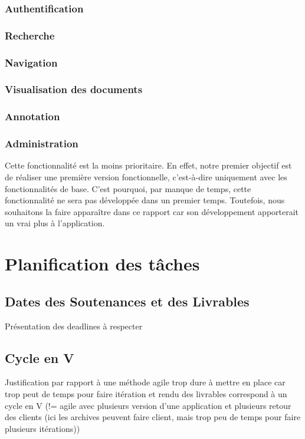 \documentclass[a4paper]{article}
\begin{document}
\subsubsection{Authentification}
\subsubsection{Recherche}
\subsubsection{Navigation}
\subsubsection{Visualisation des documents}
\subsubsection{Annotation}


\subsubsection{Administration}

	Cette fonctionnalité est la moins prioritaire. En effet, notre premier objectif est de réaliser une première version fonctionnelle, c'est-à-dire uniquement avec les fonctionnalités de base. C'est pourquoi, par manque de temps, cette fonctionnalité ne sera pas développée dans un premier temps. Toutefois, nous souhaitons la faire apparaître dans ce rapport car son développement apporterait un vrai plus à l'application.
	
\section{Planification des tâches}

	\subsection{Dates des Soutenances et des Livrables}
	
	Présentation des deadlines à respecter
	
	\subsection{Cycle en V}
	
	Justification par rapport à une méthode agile trop dure à mettre en place car trop peut de temps pour faire itération et rendu des livrables correspond à un cycle en V (!= agile avec plusieurs version d'une application et plusieurs retour des clients (ici les archives peuvent faire client, mais trop peu de temps pour faire plusieurs itérations))
	
\end{document}
